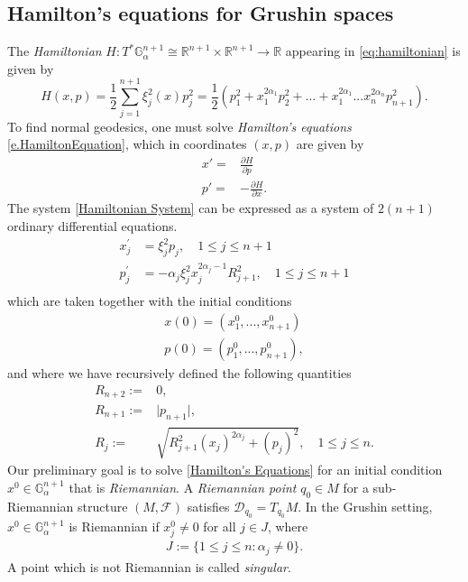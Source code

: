\documentclass[12pt]{amsart}
\numberwithin{equation}{section}
\theoremstyle{plain}
\theoremstyle{definition}
\theoremstyle{remark}
\begin{document}
\subsection{Hamilton's equations for Grushin spaces}
The \emph{Hamiltonian} $H:T^{\ast}\mathbb{G}^{n+1}_\alpha\cong \mathbb{R}^{n+1}\times \mathbb{R}^{n+1}\rightarrow \mathbb{R}$   appearing in \eqref{eq:hamiltonian} is given by
\begin{equation}\label{Hamiltonian Function}
    H(x,p)=\frac{1}{2}\sum_{j=1}^{n+1}\xi_j^2(x)p_j^2 =\frac{1}{2}(p_1^2+x_1^{2\alpha_1}p_2^2+...+x_1^{2\alpha_1} ... x_n^{2\alpha_n}p_{n+1}^2).
\end{equation}
To find normal geodesics, one must solve \emph{Hamilton's equations} \eqref{e.HamiltonEquation}, which in coordinates $(x,p)$ are given by
\begin{equation}
    \label{Hamiltonian System}
    \begin{split}
        x'= & \frac{\partial H}{\partial p}
        \\
        p'= & -\frac{\partial H}{\partial x}.
    \end{split}
\end{equation}
The system \eqref{Hamiltonian System} can be expressed as a system of $2(n+1)$ ordinary differential equations.
\begin{equation}
    \label{Hamilton's Equations}
    \begin{split}
        x_j^{\prime} & = \xi_j^2 p_j,\quad 1\leqslant j\leqslant n+1
        \\
        p_j^{\prime} & = -\alpha_j \xi_j^2 x_j^{2\alpha_j-1} R_{j+1}^2,\quad 1\leqslant j\leqslant n+1
        \\
    \end{split}
\end{equation}
which are taken together with the initial conditions
\begin{align*}
    x(0)=(x_1^0,...,x_{n+1}^0)
    \\
    p(0)=(p^0_{1},...,p_{n+1}^0),
\end{align*}
and where we have recursively defined the following quantities
\begin{align*}
    R_{n+2}:= & 0,
    \\
    R_{n+1}:= & \lvert p_{n+1}\rvert,
    \\
    R_j:=     & \sqrt{R_{j+1}^2(x_j)^{2\alpha_j}+(p_j)^2},\quad   1\leqslant j\leqslant n.
\end{align*}
Our preliminary goal is to solve \eqref{Hamilton's Equations} for an initial condition $x^0\in \mathbb{G}^{n+1}_\alpha$ that is \emph{Riemannian}. A \emph{Riemannian point} $q_0\in M$ for a sub-Riemannian structure $(M,\mathcal{F})$ satisfies $\mathcal{D}_{q_0}=T_{q_0}M$. In the Grushin setting, $x^0\in \mathbb{G}^{n+1}_\alpha$ is Riemannian if $x^0_j\neq 0$ for all $j\in J$, where
\begin{align}
    J:=\{1\leq j\leq n: \alpha_j\neq 0\}.
\end{align}A point which is not Riemannian is called \emph{singular}.
\end{document}
